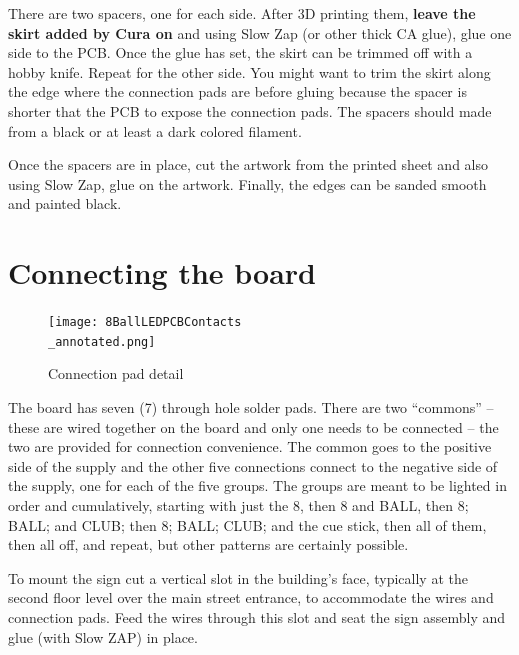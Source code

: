 \documentclass[12pt,twoside]{article}
\begin{document}
There are two spacers, one for each side. After 3D printing them,
\textbf{leave the skirt added by Cura on} and using Slow Zap (or other thick
CA glue), glue one side to the PCB. Once the glue has set, the skirt can be
trimmed off with a hobby knife. Repeat for the other side. You might want to
trim the skirt along the edge where the connection pads are before gluing
because the spacer is shorter that the PCB to expose the connection pads. The
spacers should made from a black or at least a dark colored filament.

Once the spacers are in place, cut the artwork from the printed sheet and also 
using Slow Zap, glue on the artwork.  Finally, the edges can be sanded smooth 
and painted black.

\section{Connecting the board}
\begin{figure}[hbpt]\begin{centering}%
\texttt{[image: 8BallLEDPCBContacts\\\_annotated.png]}
\caption{Connection pad detail}
\end{centering}\end{figure}

The board has seven (7) through hole solder pads.  There are two ``commons'' 
-- these are wired together on the board and only one needs to be connected -- 
the two are provided for connection convenience. The common goes to the 
positive side of the supply and the other five connections connect to the 
negative side of the supply, one for each of the five groups.  The groups are 
meant to be lighted in order and cumulatively, starting with just the 8, then 
8 and BALL, then 8; BALL; and CLUB; then 8; BALL; CLUB; and the cue stick, 
then all of them, then all off, and repeat, but other patterns are certainly 
possible. 

To mount the sign cut a vertical slot in the building's face, typically at the 
second floor level over the main street entrance, to accommodate the wires and 
connection pads.  Feed the wires through this slot and seat the sign assembly 
and glue (with Slow ZAP) in place.
\end{document}
